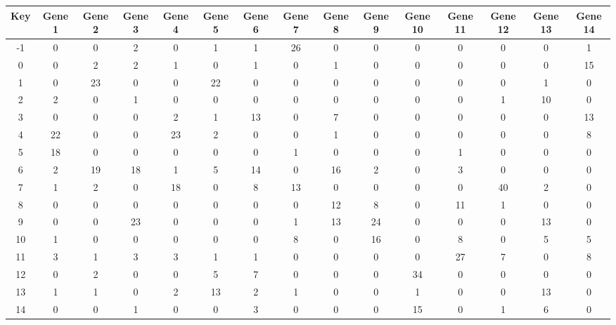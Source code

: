 \begin{tabular}{|c|c|c|c|c|c|c|c|c|c|c|c|c|c|c|}
\hline
Key & Gene 1 & Gene 2 & Gene 3 & Gene 4 & Gene 5 & Gene 6 & Gene 7 & Gene 8 & Gene 9 & Gene 10 & Gene 11 & Gene 12 & Gene 13 & Gene 14 \\
\hline
-1 & 0 & 0 & 2 & 0 & 1 & 1 & 26 & 0 & 0 & 0 & 0 & 0 & 0 & 1 \\
0 & 0 & 2 & 2 & 1 & 0 & 1 & 0 & 1 & 0 & 0 & 0 & 0 & 0 & 15 \\
1 & 0 & 23 & 0 & 0 & 22 & 0 & 0 & 0 & 0 & 0 & 0 & 0 & 1 & 0 \\
2 & 2 & 0 & 1 & 0 & 0 & 0 & 0 & 0 & 0 & 0 & 0 & 1 & 10 & 0 \\
3 & 0 & 0 & 0 & 2 & 1 & 13 & 0 & 7 & 0 & 0 & 0 & 0 & 0 & 13 \\
4 & 22 & 0 & 0 & 23 & 2 & 0 & 0 & 1 & 0 & 0 & 0 & 0 & 0 & 8 \\
5 & 18 & 0 & 0 & 0 & 0 & 0 & 1 & 0 & 0 & 0 & 1 & 0 & 0 & 0 \\
6 & 2 & 19 & 18 & 1 & 5 & 14 & 0 & 16 & 2 & 0 & 3 & 0 & 0 & 0 \\
7 & 1 & 2 & 0 & 18 & 0 & 8 & 13 & 0 & 0 & 0 & 0 & 40 & 2 & 0 \\
8 & 0 & 0 & 0 & 0 & 0 & 0 & 0 & 12 & 8 & 0 & 11 & 1 & 0 & 0 \\
9 & 0 & 0 & 23 & 0 & 0 & 0 & 1 & 13 & 24 & 0 & 0 & 0 & 13 & 0 \\
10 & 1 & 0 & 0 & 0 & 0 & 0 & 8 & 0 & 16 & 0 & 8 & 0 & 5 & 5 \\
11 & 3 & 1 & 3 & 3 & 1 & 1 & 0 & 0 & 0 & 0 & 27 & 7 & 0 & 8 \\
12 & 0 & 2 & 0 & 0 & 5 & 7 & 0 & 0 & 0 & 34 & 0 & 0 & 0 & 0 \\
13 & 1 & 1 & 0 & 2 & 13 & 2 & 1 & 0 & 0 & 1 & 0 & 0 & 13 & 0 \\
14 & 0 & 0 & 1 & 0 & 0 & 3 & 0 & 0 & 0 & 15 & 0 & 1 & 6 & 0 \\
\hline
\end{tabular}